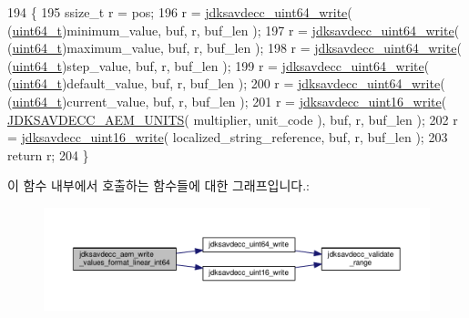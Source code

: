 \begin{DoxyCode}
194 \{
195     ssize\_t r = pos;
196     r = \hyperlink{group__endian_gaa294fd85c2d887032dad294c6833c903}{jdksavdecc\_uint64\_write}( (\hyperlink{parse_8c_aec6fcb673ff035718c238c8c9d544c47}{uint64\_t})minimum\_value, buf, r, buf\_len );
197     r = \hyperlink{group__endian_gaa294fd85c2d887032dad294c6833c903}{jdksavdecc\_uint64\_write}( (\hyperlink{parse_8c_aec6fcb673ff035718c238c8c9d544c47}{uint64\_t})maximum\_value, buf, r, buf\_len );
198     r = \hyperlink{group__endian_gaa294fd85c2d887032dad294c6833c903}{jdksavdecc\_uint64\_write}( (\hyperlink{parse_8c_aec6fcb673ff035718c238c8c9d544c47}{uint64\_t})step\_value, buf, r, buf\_len );
199     r = \hyperlink{group__endian_gaa294fd85c2d887032dad294c6833c903}{jdksavdecc\_uint64\_write}( (\hyperlink{parse_8c_aec6fcb673ff035718c238c8c9d544c47}{uint64\_t})default\_value, buf, r, buf\_len );
200     r = \hyperlink{group__endian_gaa294fd85c2d887032dad294c6833c903}{jdksavdecc\_uint64\_write}( (\hyperlink{parse_8c_aec6fcb673ff035718c238c8c9d544c47}{uint64\_t})current\_value, buf, r, buf\_len );
201     r = \hyperlink{group__endian_ga4c0851ce17bde5306fdb04bfb5b75af1}{jdksavdecc\_uint16\_write}( \hyperlink{group__aem__descriptor_gae5f7498f6048b4dda1aca923b0eae0f6}{JDKSAVDECC\_AEM\_UNITS}( 
      multiplier, unit\_code ), buf, r, buf\_len );
202     r = \hyperlink{group__endian_ga4c0851ce17bde5306fdb04bfb5b75af1}{jdksavdecc\_uint16\_write}( localized\_string\_reference, buf, r, buf\_len );
203     \textcolor{keywordflow}{return} r;
204 \}
\end{DoxyCode}


이 함수 내부에서 호출하는 함수들에 대한 그래프입니다.\+:
\nopagebreak
\begin{figure}[H]
\begin{center}
\leavevmode
\includegraphics[width=350pt]{group__aem__descriptor_ga32c077be9fca842d1ac07ac50d681d5d_cgraph}
\end{center}
\end{figure}


